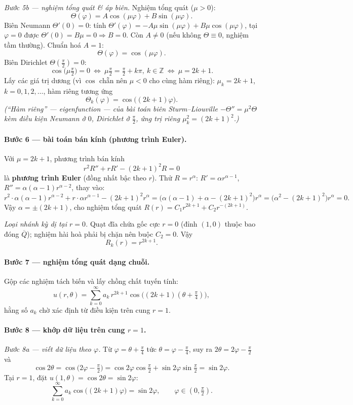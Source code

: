 \emph{Bước 5b --- nghiệm tổng quát \& áp biên.} Nghiệm tổng quát ($\mu>0$):
\[
  \Theta(\varphi)=A\cos(\mu\varphi)+B\sin(\mu\varphi).
\]
Biên Neumann $\Theta'(0)=0$: tính $\Theta'(\varphi)=-A\mu\sin(\mu\varphi)+B\mu\cos(\mu\varphi)$, tại $\varphi=0$ được $\Theta'(0)=B\mu=0\Rightarrow B=0$. Còn $A\ne 0$ (nếu không $\Theta\equiv0$, nghiệm tầm thường). Chuẩn hoá $A=1$:
\[
  \Theta(\varphi)=\cos(\mu\varphi).
\]
Biên Dirichlet $\Theta(\tfrac{\pi}{2})=0$:
\[
  \cos\!\big(\mu\tfrac{\pi}{2}\big)=0\ \Longleftrightarrow\ \mu\tfrac{\pi}{2}=\tfrac{\pi}{2}+k\pi,\ k\in\mathbb{Z}
  \ \Longleftrightarrow\ \mu=2k+1.
\]
Lấy các giá trị dương (vì $\cos$ chẵn nên $\mu<0$ cho cùng hàm riêng): $\mu_k=2k+1$, $k=0,1,2,\dots$, hàm riêng tương ứng
\[
  \Theta_k(\varphi)=\cos\!\big((2k+1)\varphi\big).
\]
\emph{(``Hàm riêng'' --- eigenfunction --- của bài toán biên Sturm--Liouville $-\Theta''=\mu^2\Theta$ kèm điều kiện Neumann ở $0$, Dirichlet ở $\tfrac{\pi}{2}$, ứng trị riêng $\mu_k^2=(2k+1)^2$.)}

\paragraph{Bước 6 --- bài toán bán kính (phương trình Euler).}
Với $\mu=2k+1$, phương trình bán kính
\[
  r^2 R''+r R'-(2k+1)^2 R=0
\]
là \textbf{phương trình Euler} (đồng nhất bậc theo $r$). Thử $R=r^\alpha$: $R'=\alpha r^{\alpha-1}$, $R''=\alpha(\alpha-1)r^{\alpha-2}$, thay vào:
\[
  r^2\cdot\alpha(\alpha-1)r^{\alpha-2}+r\cdot\alpha r^{\alpha-1}-(2k+1)^2 r^\alpha
  =\big(\alpha(\alpha-1)+\alpha-(2k+1)^2\big)r^\alpha
  =\big(\alpha^2-(2k+1)^2\big)r^\alpha=0.
\]
Vậy $\alpha=\pm(2k+1)$, cho nghiệm tổng quát $R(r)=C_1 r^{2k+1}+C_2 r^{-(2k+1)}$.

\emph{Loại nhánh kỳ dị tại $r=0$.} Quạt đĩa chứa gốc cực $r=0$ (đỉnh $(1,0)$ thuộc bao đóng $\overline{Q}$); nghiệm hài hoà phải bị chặn nên buộc $C_2=0$. Vậy
\[
  R_k(r)=r^{2k+1}.
\]

\paragraph{Bước 7 --- nghiệm tổng quát dạng chuỗi.}
Gộp các nghiệm tách biến và lấy chồng chất tuyến tính:
\[
  u(r,\theta)=\sum_{k=0}^{\infty} a_k\,r^{2k+1}\cos\!\big((2k+1)(\theta+\tfrac{\pi}{4})\big),
\]
hằng số $a_k$ chờ xác định từ điều kiện trên cung $r=1$.

\paragraph{Bước 8 --- khớp dữ liệu trên cung $r=1$.}
\emph{Bước 8a --- viết dữ liệu theo $\varphi$.} Từ $\varphi=\theta+\tfrac{\pi}{4}$ tức $\theta=\varphi-\tfrac{\pi}{4}$, suy ra $2\theta=2\varphi-\tfrac{\pi}{2}$ và
\[
  \cos 2\theta=\cos\!\big(2\varphi-\tfrac{\pi}{2}\big)=\cos 2\varphi\cos\tfrac{\pi}{2}+\sin 2\varphi\sin\tfrac{\pi}{2}=\sin 2\varphi.
\]
Tại $r=1$, đặt $u(1,\theta)=\cos 2\theta=\sin 2\varphi$:
\[
  \sum_{k=0}^{\infty} a_k\cos\!\big((2k+1)\varphi\big)=\sin 2\varphi,\qquad \varphi\in(0,\tfrac{\pi}{2}).
\]


